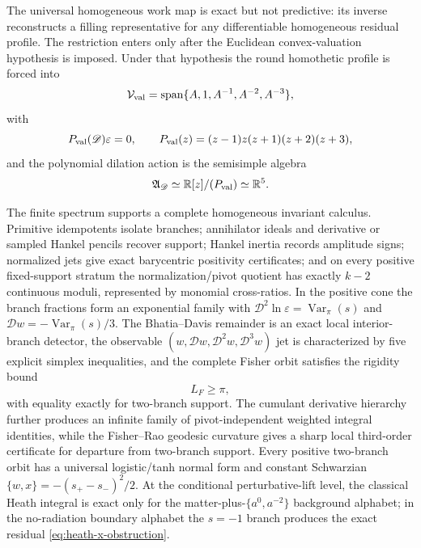 \documentclass[aps,prd,preprint,onecolumn,nofootinbib,superscriptaddress,showkeys]{revtex4-2}
\numberwithin{equation}{section}
\theoremstyle{definition}
\theoremstyle{plain}
\newcommand{\R}{\mathbb R}
\newcommand{\Dil}{\mathscr D}
\newcommand{\spanop}{\operatorname{span}}
\begin{document}
The universal homogeneous work map is exact but not predictive: its inverse reconstructs a filling representative for any differentiable homogeneous residual profile.  The restriction enters only after the Euclidean convex-valuation hypothesis is imposed.  Under that hypothesis the round homothetic profile is forced into
\begin{equation}
\mathcal V_{\rm val}=\spanop\{A,1,A^{-1},A^{-2},A^{-3}\},
\end{equation}
with
\begin{equation}
P_{\rm val}(\Dil)\varepsilon=0,
\qquad
P_{\rm val}(z)=(z-1)z(z+1)(z+2)(z+3),
\end{equation}
and the polynomial dilation action is the semisimple algebra
\begin{equation}
\mathfrak A_{\Dil}\simeq\R[z]/(P_{\rm val})\simeq\R^5.
\end{equation}

The finite spectrum supports a complete homogeneous invariant calculus.  Primitive idempotents isolate branches; annihilator ideals and derivative or sampled Hankel pencils recover support; Hankel inertia records amplitude signs; normalized jets give exact barycentric positivity certificates; and on every positive fixed-support stratum the normalization/pivot quotient has exactly \(k-2\) continuous moduli, represented by monomial cross-ratios.  In the positive cone the branch fractions form an exponential family with \(\Dil^2\ln\varepsilon=\operatorname{Var}_\pi(s)\) and \(\Dil w=-\operatorname{Var}_\pi(s)/3\).  The Bhatia--Davis remainder is an exact local interior-branch detector, the observable \((w,\Dil w,\Dil^2w,\Dil^3w)\) jet is characterized by five explicit simplex inequalities, and the complete Fisher orbit satisfies the rigidity bound
\begin{equation}
L_F\ge\pi,
\end{equation}
with equality exactly for two-branch support.  The cumulant derivative hierarchy further produces an infinite family of pivot-independent weighted integral identities, while the Fisher--Rao geodesic curvature gives a sharp local third-order certificate for departure from two-branch support.  Every positive two-branch orbit has a universal logistic/tanh normal form and constant Schwarzian \(\{w,x\}=-(s_+-s_-)^2/2\).  At the conditional perturbative-lift level, the classical Heath integral is exact only for the matter-plus-\(\{a^0,a^{-2}\}\) background alphabet; in the no-radiation boundary alphabet the \(s=-1\) branch produces the exact residual \cref{eq:heath-x-obstruction}.
\end{document}
